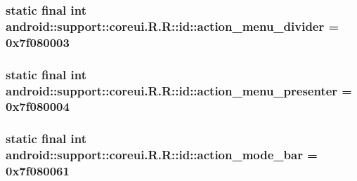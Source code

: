 \hypertarget{classandroid_1_1support_1_1coreui_1_1_r_1_1id_3c90a687d4ae43b10dede2b34055b2ad}{
\subsubsection[{action\_\-menu\_\-divider}]{\setlength{\rightskip}{0pt plus 5cm}static final int android::support::coreui.R.R::id::action\_\-menu\_\-divider = 0x7f080003}}
\label{classandroid_1_1support_1_1coreui_1_1_r_1_1id_3c90a687d4ae43b10dede2b34055b2ad}


\hypertarget{classandroid_1_1support_1_1coreui_1_1_r_1_1id_b2f19c64ac01604daac87589169cef2c}{
\subsubsection[{action\_\-menu\_\-presenter}]{\setlength{\rightskip}{0pt plus 5cm}static final int android::support::coreui.R.R::id::action\_\-menu\_\-presenter = 0x7f080004}}
\label{classandroid_1_1support_1_1coreui_1_1_r_1_1id_b2f19c64ac01604daac87589169cef2c}


\hypertarget{classandroid_1_1support_1_1coreui_1_1_r_1_1id_f47f043147e68fa19777b66176ef6506}{
\subsubsection[{action\_\-mode\_\-bar}]{\setlength{\rightskip}{0pt plus 5cm}static final int android::support::coreui.R.R::id::action\_\-mode\_\-bar = 0x7f080061}}
\label{classandroid_1_1support_1_1coreui_1_1_r_1_1id_f47f043147e68fa19777b66176ef6506}


